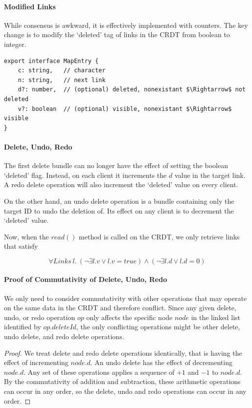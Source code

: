 \documentclass[12pt,a4paper,twoside,openright]{report}
\begin{document}
			\paragraph{Modified Links}
			While consensus is awkward, it is effectively implemented with counters. The key change is to modify the `deleted' tag of links in the CRDT from boolean to integer.
			
\begin{lstlisting}[caption={New Type Signature of a Link in the CRDT}, mathescape=true]
export interface MapEntry {
	c: string,   // character
	n: string,   // next link
	d?: number,  // (optional) deleted, nonexistant $\Rightarrow$ not deleted
	v?: boolean  // (optional) visible, nonexistant $\Rightarrow$ visible
}
\end{lstlisting}

			\paragraph{Delete, Undo, Redo}
			The first delete bundle can no longer have the effect of setting the boolean `deleted' flag. Instead, on each client it increments the $d$ value in the target link. A redo delete operation will also increment the `deleted' value on every client.
			
			On the other hand, an undo delete operation is a bundle containing only the target ID to undo the deletion of. Its effect on any client is to decrement the `deleted' value.
			
			Now, when the $read()$ method is called on the CRDT, we only retrieve links that satisfy
			
				\[\forall Links\ l.\  (\lnot\exists l.v \lor l.v = true) \land (\lnot\exists l.d \lor l.d = 0 ) \] 
			
			\paragraph{Proof of Commutativity of Delete, Undo, Redo}
			We only need to consider commutativity with other operations that may operate on the same data in the CRDT and therefore conflict. Since any given delete, undo, or redo operation $op$ only affects the specific node $node$ in the linked list identified by $op.deleteId$, the only conflicting operations might be other delete, undo delete, and redo delete operations.
			
			\begin{proof}
				We treat delete and redo delete operations identically, that is having the effect of incrementing $node.d$. An undo delete has the effect of decrementing $node.d$. Any set of these operations applies a sequence of $+1$ and $-1$ to $node.d$. By the commutativity of addition and subtraction, these arithmetic operations can occur in any order, so the delete, undo and redo operations can occur in any order.
			\end{proof}
			
\end{document}
